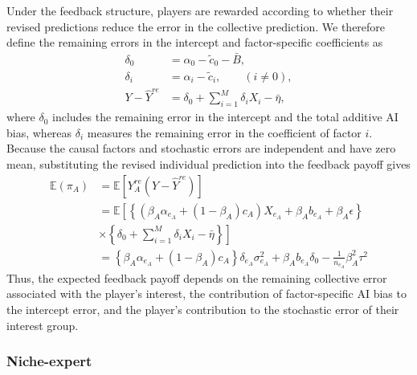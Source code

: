 \documentclass[12pt]{article}
\begin{document}
Under the feedback structure, players are rewarded according to whether their revised predictions reduce the error in the collective prediction. We therefore define the remaining errors in the intercept and factor-specific coefficients as
\begin{align}
\delta_0 &= \alpha_0 - \tilde{c}_0 - \bar{B},\\
\delta_i &= \alpha_i - \tilde{c}_i, \qquad (i\neq 0),\\
Y - \hat{Y}^{re} &= \delta_0 + \sum_{i = 1}^{M}\delta_iX_i - \bar{\eta},
\end{align}
where $\delta_0$ includes the remaining error in the intercept and the total additive AI bias, whereas $\delta_i$ measures the remaining error in the coefficient of factor $i$. 
Because the causal factors and stochastic errors are independent and have zero mean, substituting the revised individual prediction into the feedback payoff gives
\begin{align}
\mathbb{E}(\pi_A)
&= \mathbb{E}[Y_A^{re}(Y - \hat{Y}^{re})] \\
&= \mathbb{E}\left[\left\{\left(\beta_A\alpha_{e_A} + (1-\beta_A)c_A\right)X_{e_A} + \beta_Ab_{e_A} + \beta_A\epsilon\right\}\right.\\
&\times \left. \left\{\delta_0 + \sum_{i = 1}^{M}\delta_iX_i - \bar{\eta}\right\}\right] \\
&= \left\{\beta_A\alpha_{e_A} + (1-\beta_A)c_A\right\}\delta_{e_A}\sigma_{e_A}^2 + \beta_Ab_{e_A}\delta_0 - \frac{1}{n_{e_A}}\beta_A^2\tau^2
\end{align}
Thus, the expected feedback payoff depends on the remaining collective error associated with the player's interest, the contribution of factor-specific AI bias to the intercept error, and the player's contribution to the stochastic error of their interest group.

\subsubsection*{Niche-expert}
\end{document}
